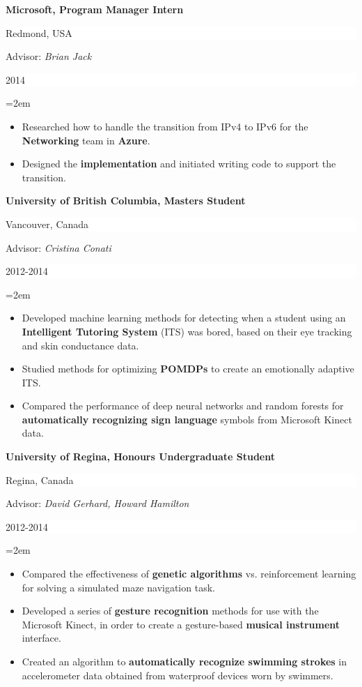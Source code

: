 \documentclass[paper=letter,fontsize=11pt]{scrartcl} %
\newcommand{\sepspace}{\vspace*{1em}}		%
\newcommand{\ResearchEntry}[5]{
		\noindent \textbf{#1} \hfill      %
		\colorbox{White}{%
			\parbox{10em}{%
			\hfill\color{Black}#2}} \par  %
		\noindent Advisor: \textit{#3} \hfill      %
		\colorbox{White}{%
			\parbox{6em}{%
			\hfill\color{Black}#4}} \par  %
		\noindent\hangindent=2em\hangafter=0 \small #5 %
		\normalsize \par}
\begin{document}
\ResearchEntry{Microsoft, Program Manager Intern}{Redmond, USA}{Brian Jack}{2014}
{\begin{itemize}
    \item Researched how to handle the transition from IPv4 to IPv6 for the \textbf{Networking} team in \textbf{Azure}.
    \item Designed the \textbf{implementation} and initiated writing code to support the transition.
\end{itemize}}
\sepspace

\ResearchEntry{University of British Columbia, Masters Student}{Vancouver, Canada}{Cristina Conati}{2012-2014}
{\begin{itemize}
    \item Developed machine learning methods for detecting when a student using an \textbf{Intelligent Tutoring System} (ITS) was bored, based on their eye tracking and skin conductance data.
    \item Studied methods for optimizing \textbf{POMDPs} to create an emotionally adaptive ITS. 
    \item Compared the performance of deep neural networks and random forests for \textbf{automatically recognizing sign language} symbols from Microsoft Kinect data. 
\end{itemize}}
\sepspace

\ResearchEntry{University of Regina, Honours Undergraduate Student}{Regina, Canada}{David Gerhard, Howard Hamilton}{2012-2014}
{\begin{itemize}
    \item Compared the effectiveness of \textbf{genetic algorithms} vs. reinforcement learning for solving a simulated maze navigation task. 
    \item Developed a series of \textbf{gesture recognition} methods for use with the Microsoft Kinect, in order to create a gesture-based \textbf{musical instrument} interface.
    \item Created an algorithm to \textbf{automatically recognize swimming strokes} in accelerometer data obtained from waterproof devices worn by swimmers.
\end{itemize}}
\sepspace
\end{document}
